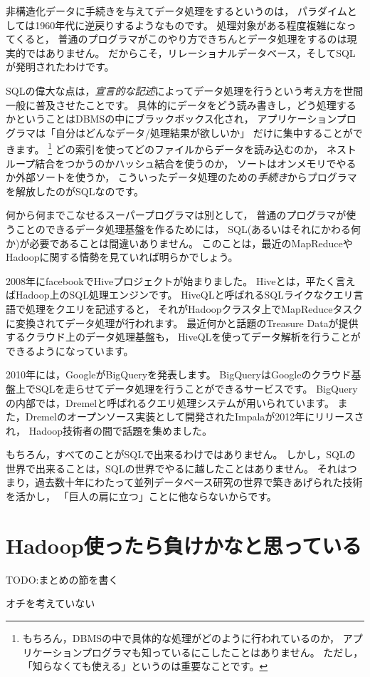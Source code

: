 非構造化データに手続きを与えてデータ処理をするというのは，
パラダイムとしては1960年代に逆戻りするようなものです。
処理対象がある程度複雑になってくると，
普通のプログラマがこのやり方できちんとデータ処理をするのは現実的ではありません。
だからこそ，リレーショナルデータベース，そしてSQLが発明されたわけです。

SQLの偉大な点は，{\em 宣言的な記述}によってデータ処理を行うという考え方を世間一般に普及させたことです。
具体的にデータをどう読み書きし，どう処理するかということはDBMSの中にブラックボックス化され，
アプリケーションプログラマは「自分はどんなデータ/処理結果が欲しいか」
だけに集中することができます。
\footnote{もちろん，DBMSの中で具体的な処理がどのように行われているのか，
アプリケーションプログラマも知っているにこしたことはありません。
ただし，「知らなくても使える」というのは重要なことです。}
どの索引を使ってどのファイルからデータを読み込むのか，
ネストループ結合をつかうのかハッシュ結合を使うのか，
ソートはオンメモリでやるか外部ソートを使うか，
こういったデータ処理のための{\em 手続き}からプログラマを解放したのがSQLなのです。

何から何までこなせるスーパープログラマは別として，
普通のプログラマが使うことのできるデータ処理基盤を作るためには，
SQL(あるいはそれにかわる何か)が必要であることは間違いありません。
このことは，最近のMapReduceやHadoopに関する情勢を見ていれば明らかでしょう。

2008年にfacebookでHiveプロジェクトが始まりました。
Hiveとは，平たく言えばHadoop上のSQL処理エンジンです。
HiveQLと呼ばれるSQLライクなクエリ言語で処理をクエリを記述すると，
それがHadoopクラスタ上でMapReduceタスクに変換されてデータ処理が行われます。
最近何かと話題のTreasure Dataが提供するクラウド上のデータ処理基盤も，
HiveQLを使ってデータ解析を行うことができるようになっています。

2010年には，GoogleがBigQueryを発表します。
BigQueryはGoogleのクラウド基盤上でSQLを走らせてデータ処理を行うことができるサービスです。
BigQueryの内部では，Dremelと呼ばれるクエリ処理システムが用いられています。
また，Dremelのオープンソース実装として開発されたImpalaが2012年にリリースされ，
Hadoop技術者の間で話題を集めました。

もちろん，すべてのことがSQLで出来るわけではありません。
しかし，SQLの世界で出来ることは，SQLの世界でやるに越したことはありません。
それはつまり，過去数十年にわたって並列データベース研究の世界で築きあげられた技術を活かし，
「巨人の肩に立つ」ことに他ならないからです。

\section{Hadoop使ったら負けかなと思っている}

TODO:まとめの節を書く

オチを考えていない